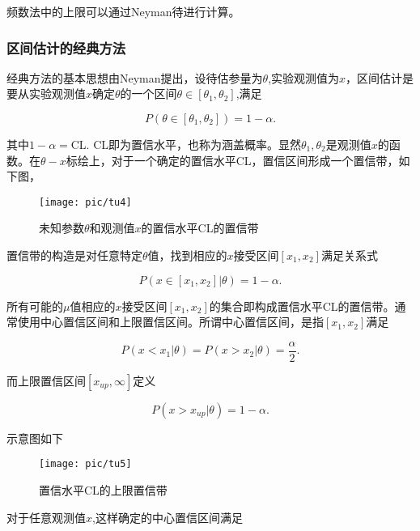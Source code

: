 频数法中的上限可以通过Neyman待进行计算。
\subsubsection{区间估计的经典方法}

经典方法的基本思想由Neyman提出，设待估参量为$\theta$,实验观测值为$x$，区间估计是要从实验观测值$x$确定$\theta$的一个区间$\theta \in \left[\theta_{1},\theta_{2}\right]$,满足

\begin{equation}\label{key}
P(\theta \in \left[\theta_{1},\theta_{2}\right])=1-\alpha.
\end{equation}

其中$1-\alpha=$CL. CL即为置信水平，也称为涵盖概率。显然$\theta_{1},\theta_{2}$是观测值$x$的函数。在$\theta-x$标绘上，对于一个确定的置信水平CL，置信区间形成一个置信带，如下图，

\begin{figure}[ht]
	\centering
	\texttt{[image: pic/tu4]}
	\caption{未知参数$\theta$和观测值$x$的置信水平CL的置信带}
	\label{fig:4}
\end{figure}

置信带的构造是对任意特定$\theta$值，找到相应的$x$接受区间$[x_{1},x_{2}]$满足关系式

\begin{equation}\label{key}
P(x \in \left[x_{1},x_{2}\right]|\theta)=1-\alpha.
\end{equation}

所有可能的$\mu$值相应的$x$接受区间$\left[x_{1},x_{2}\right]$的集合即构成置信水平CL的置信带。通常使用中心置信区间和上限置信区间。所谓中心置信区间，是指$\left[x_{1},x_{2}\right]$满足

\begin{equation}\label{key}
P(x<x_{1}|\theta)=P(x>x_{2}|\theta)=\frac{\alpha}{2}.
\end{equation}

而上限置信区间$[x_{up},\infty]$定义

\begin{equation}\label{key}
P(x>x_{up}|\theta)=1-\alpha.
\end{equation}

示意图如下

\begin{figure}[ht]
	\centering
	\texttt{[image: pic/tu5]}
	\caption{置信水平CL的上限置信带}
	\label{fig:5}
\end{figure}

对于任意观测值$x$,这样确定的中心置信区间满足

